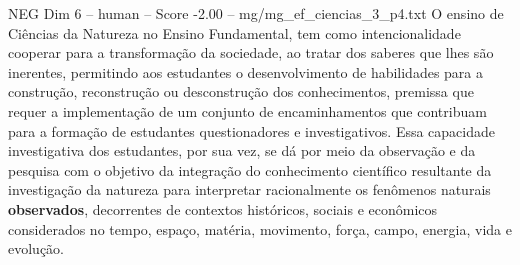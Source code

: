 \begin{textsample}{NEG Dim 6 – human – Score -2.00 – mg/mg\_ef\_ciencias\_3\_p4.txt}  \label{ex:f6_neg_020}
O ensino de Ciências da Natureza no Ensino Fundamental, tem como intencionalidade cooperar para a transformação da sociedade, ao tratar dos saberes que lhes são inerentes, permitindo aos estudantes o desenvolvimento de habilidades para a construção, reconstrução ou desconstrução dos conhecimentos, premissa que requer a implementação de um conjunto de encaminhamentos que contribuam para a formação de estudantes questionadores e investigativos.
Essa capacidade investigativa dos estudantes, por sua vez, se dá por meio da observação e da pesquisa com o objetivo da integração do conhecimento científico resultante da investigação da natureza para interpretar racionalmente os fenômenos naturais \textbf{observados}, decorrentes de contextos históricos, sociais e econômicos considerados no tempo, espaço, matéria, movimento, força, campo, energia, vida e evolução.

\end{textsample}
